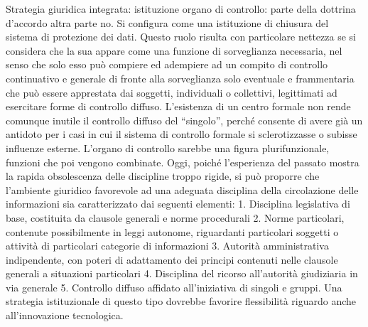 Strategia giuridica integrata:
istituzione organo di controllo: parte della dottrina d’accordo altra parte no. Si configura come una istituzione di chiusura del sistema di protezione dei dati. Questo ruolo risulta con particolare nettezza se si considera che la sua appare come una funzione di sorveglianza necessaria, nel senso che solo esso può compiere ed adempiere ad un compito di controllo continuativo e generale di fronte alla sorveglianza solo eventuale e frammentaria che può essere apprestata dai soggetti, individuali o collettivi, legittimati ad esercitare forme di controllo diffuso. L’esistenza di un centro formale non rende comunque inutile il controllo diffuso del “singolo”, perché consente di avere già un antidoto per i casi in cui il sistema di controllo formale si sclerotizzasse o subisse influenze esterne. L’organo di controllo sarebbe una figura plurifunzionale, funzioni che poi vengono combinate.
Oggi, poiché l’esperienza del passato mostra la rapida obsolescenza delle discipline troppo rigide, si può proporre che l’ambiente giuridico favorevole ad una adeguata disciplina della circolazione delle informazioni sia caratterizzato dai seguenti elementi:
1.	Disciplina legislativa di base, costituita da clausole generali e norme procedurali
2.	Norme particolari, contenute possibilmente in leggi autonome, riguardanti particolari soggetti o attività di particolari categorie di informazioni
3.	Autorità amministrativa indipendente, con poteri di adattamento dei principi contenuti nelle clausole generali a situazioni particolari
4.	Disciplina del ricorso all’autorità giudiziaria in via generale
5.	Controllo diffuso affidato all’iniziativa di singoli e gruppi.
Una strategia istituzionale di questo tipo dovrebbe favorire flessibilità riguardo anche all’innovazione tecnologica.

